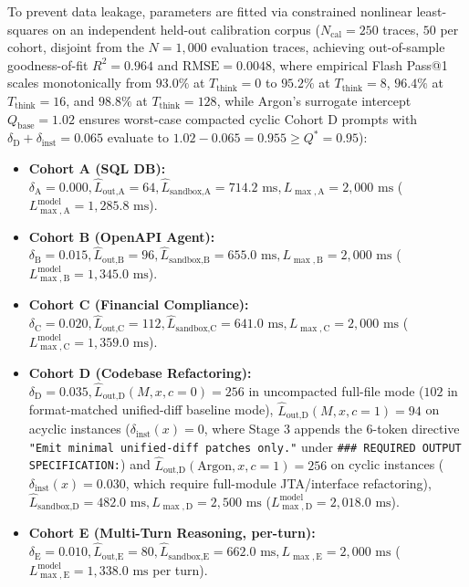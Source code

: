 \documentclass[conference,10pt]{IEEEtran}
\begin{document}
To prevent data leakage, parameters are fitted via constrained nonlinear least-squares on an independent held-out calibration corpus ($N_{\text{cal}} = 250$ traces, $50$ per cohort, disjoint from the $N = 1{,}000$ evaluation traces, achieving out-of-sample goodness-of-fit $R^2 = 0.964$ and $\text{RMSE} = 0.0048$, where empirical Flash Pass@1 scales monotonically from $93.0\%$ at $T_{\text{think}}=0$ to $95.2\%$ at $T_{\text{think}}=8$, $96.4\%$ at $T_{\text{think}}=16$, and $98.8\%$ at $T_{\text{think}}=128$, while Argon's surrogate intercept $Q_{\text{base}}=1.02$ ensures worst-case compacted cyclic Cohort D prompts with $\delta_{\text{D}} + \delta_{\text{inst}} = 0.065$ evaluate to $1.02 - 0.065 = 0.955 \ge Q^* = 0.95$):
\begin{itemize}
    \item \textbf{Cohort A (SQL DB):} $\delta_{\text{A}}=0.000, \hat{L}_{\text{out,A}}=64, \hat{L}_{\text{sandbox,A}}=714.2\text{ ms}, L_{\max,\text{A}}=2{,}000\text{ ms}$ ($L_{\max,\text{A}}^{\text{model}} = 1{,}285.8\text{ ms}$).
    \item \textbf{Cohort B (OpenAPI Agent):} $\delta_{\text{B}}=0.015, \hat{L}_{\text{out,B}}=96, \hat{L}_{\text{sandbox,B}}=655.0\text{ ms}, L_{\max,\text{B}}=2{,}000\text{ ms}$ ($L_{\max,\text{B}}^{\text{model}} = 1{,}345.0\text{ ms}$).
    \item \textbf{Cohort C (Financial Compliance):} $\delta_{\text{C}}=0.020, \hat{L}_{\text{out,C}}=112, \hat{L}_{\text{sandbox,C}}=641.0\text{ ms}, L_{\max,\text{C}}=2{,}000\text{ ms}$ ($L_{\max,\text{C}}^{\text{model}} = 1{,}359.0\text{ ms}$).
    \item \textbf{Cohort D (Codebase Refactoring):} $\delta_{\text{D}}=0.035, \hat{L}_{\text{out,D}}(M, x, c=0)=256$ in uncompacted full-file mode ($102$ in format-matched unified-diff baseline mode), $\hat{L}_{\text{out,D}}(M, x, c=1)=94$ on acyclic instances ($\delta_{\text{inst}}(x)=0$, where Stage 3 appends the 6-token directive \texttt{"Emit minimal unified-diff patches only."} under \texttt{\#\#\# REQUIRED OUTPUT SPECIFICATION:}) and $\hat{L}_{\text{out,D}}(\text{Argon}, x, c=1)=256$ on cyclic instances ($\delta_{\text{inst}}(x)=0.030$, which require full-module JTA/interface refactoring), $\hat{L}_{\text{sandbox,D}}=482.0\text{ ms}, L_{\max,\text{D}}=2{,}500\text{ ms}$ ($L_{\max,\text{D}}^{\text{model}} = 2{,}018.0\text{ ms}$).
    \item \textbf{Cohort E (Multi-Turn Reasoning, per-turn):} $\delta_{\text{E}}=0.010, \hat{L}_{\text{out,E}}=80, \hat{L}_{\text{sandbox,E}}=662.0\text{ ms}, L_{\max,\text{E}}=2{,}000\text{ ms}$ ($L_{\max,\text{E}}^{\text{model}} = 1{,}338.0\text{ ms}$ per turn).
\end{itemize}
\end{document}
